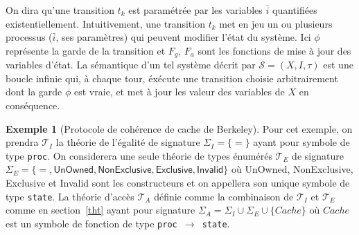 \documentclass[a4paper, twoside]{scrartcl}
\theoremstyle{plain}%
\theoremstyle{definition}
\newtheorem{exmp}{Exemple}[section]
\theoremstyle{remark}
\begin{document}
On dira qu'une transition $t_k$ est paramétrée par les variables
$\bar{i}$ quantifiées existentiellement. Intuitivement, une transition
$t_k$ met en jeu un ou plusieurs processus ($\bar{i}$, ses paramètres)
qui peuvent modifier l'état du système. Ici $\phi$ représente la garde
de la transition et $F_g$, $F_a$ sont les fonctions de mise à jour des
variables d'état. La sémantique d'un tel système décrit par
$\mathcal{S} = (X, I, \tau)$ est une boucle infinie qui, à chaque
tour, éxécute une transition choisie arbitrairement dont la garde
$\phi$ est vraie, et met à jour les valeur des variables de $X$ en
conséquence.


\begin{exmp}[Protocole de cohérence de cache de Berkeley]

  Pour cet exemple, on prendra $\mathcal{T}_I$ la théorie de l'égalité
  de signature $\Sigma_I = \{ = \} $ ayant pour symbole de type
  \texttt{proc}. On considerera une seule théorie de types énumérés
  $\mathcal{T}_E$ de signature $\Sigma_E = \{ =, \mathsf{UnOwned},
  \mathsf{NonExclusive}, \mathsf{Exclusive}, \mathsf{Invalid} \} $ où
  \textsf{UnOwned}, \textsf{NonExclusive}, \textsf{Exclusive} et
  \textsf{Invalid} sont les constructeurs et on appellera son unique
  symbole de type \texttt{state}. La théorie d'accès $\mathcal{T}_A$
  définie comme la combinaison de $\mathcal{T}_I$ et $\mathcal{T}_E$
  comme en section~\ref{tht} ayant pour signature $\Sigma_{A} =
  \Sigma_I \cup \Sigma_{E} \cup \{ Cache \}$ où $Cache$ est un symbole
  de fonction de type \texttt{proc $\to$ state}.


\end{exmp}
\end{document}
